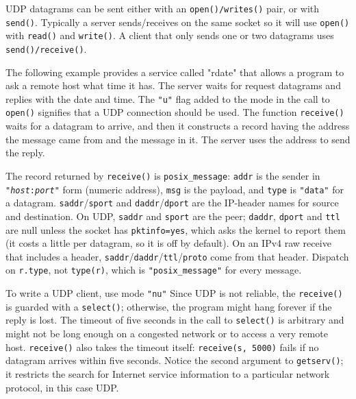 UDP datagrams can be sent either with an \texttt{open()/writes()}
pair, or with \texttt{send()}. Typically a server sends/receives on the
same socket so it will use \texttt{open()} with \texttt{read()} and
\texttt{write()}. A client that only sends one or two datagrams uses
\texttt{send()}\texttt{/}\texttt{receive()}.

The following example provides a service called
"rdate" that allows a program to ask a
remote host what time it has. The server waits for request datagrams
and replies with the date and time. The
\texttt{"u"} flag added to the mode in the
call to \texttt{open()} signifies that a UDP connection should be used.
The function \texttt{receive()} waits for a datagram to arrive, and
then it constructs a record having the address the message came from
and the message in it. The server uses the address to send the reply.


The record returned by \texttt{receive()} is
\texttt{posix\_message}: \texttt{addr} is the sender in
\texttt{"}\texttt{\textit{host}}\texttt{:}\texttt{\textit{port}}\texttt{"}
form (numeric address), \texttt{msg} is the payload, and
\texttt{type} is \texttt{"data"} for a datagram. \texttt{saddr}/\texttt{sport}
and \texttt{daddr}/\texttt{dport} are the IP-header names for source and
destination. On UDP, \texttt{saddr} and \texttt{sport} are the peer;
\texttt{daddr}, \texttt{dport} and \texttt{ttl} are null unless the
socket has \texttt{pktinfo=yes}, which asks the kernel to report them
(it costs a little per datagram, so it is off by default). On an IPv4
raw receive that includes a header,
\texttt{saddr}/\texttt{daddr}/\texttt{ttl}/\texttt{proto}
come from that header. Dispatch on \texttt{r.type}, not
\texttt{type(r)}, which is \texttt{"posix\_message"} for every
message.

To write a UDP client, use mode \texttt{"nu"}
Since UDP is not reliable, the \texttt{receive()} is guarded
with a \texttt{select()}; otherwise, the program might hang forever if
the reply is lost. The timeout of five seconds in the call to
\texttt{select()} is arbitrary and might not be long enough on a
congested network or to access a very remote host. \texttt{receive()}
also takes the timeout itself: \texttt{receive(s, 5000)} fails if no
datagram arrives within five seconds. Notice the second
argument to \texttt{getserv()}; it restricts the search for Internet
service information to a particular network protocol, in this case UDP.

